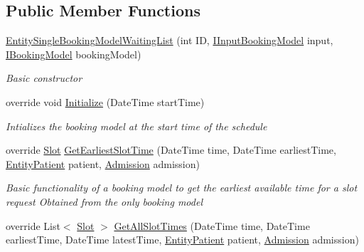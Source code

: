 \subsection*{Public Member Functions}
\begin{DoxyCompactItemize}
\item 
\hyperlink{class_general_health_care_elements_1_1_booking_models_1_1_entity_single_booking_model_waiting_list_aeac599ee0be6d7b497ce64829d4b53be}{Entity\+Single\+Booking\+Model\+Waiting\+List} (int ID, \hyperlink{interface_general_health_care_elements_1_1_department_models_1_1_outpatient_1_1_i_input_booking_model}{I\+Input\+Booking\+Model} input, \hyperlink{interface_general_health_care_elements_1_1_booking_models_1_1_i_booking_model}{I\+Booking\+Model} booking\+Model)
\begin{DoxyCompactList}\small\item\em Basic constructor \end{DoxyCompactList}\item 
override void \hyperlink{class_general_health_care_elements_1_1_booking_models_1_1_entity_single_booking_model_waiting_list_a9b8ad20df10518d7fbaf901707023b17}{Initialize} (Date\+Time start\+Time)
\begin{DoxyCompactList}\small\item\em Intializes the booking model at the start time of the schedule \end{DoxyCompactList}\item 
override \hyperlink{class_general_health_care_elements_1_1_booking_models_1_1_slot}{Slot} \hyperlink{class_general_health_care_elements_1_1_booking_models_1_1_entity_single_booking_model_waiting_list_ab1a3022462e90e9e342489805a27d0cd}{Get\+Earliest\+Slot\+Time} (Date\+Time time, Date\+Time earliest\+Time, \hyperlink{class_general_health_care_elements_1_1_entities_1_1_entity_patient}{Entity\+Patient} patient, \hyperlink{class_general_health_care_elements_1_1_treatment_admission_types_1_1_admission}{Admission} admission)
\begin{DoxyCompactList}\small\item\em Basic functionality of a booking model to get the earliest available time for a slot request Obtained from the only booking model \end{DoxyCompactList}\item 
override List$<$ \hyperlink{class_general_health_care_elements_1_1_booking_models_1_1_slot}{Slot} $>$ \hyperlink{class_general_health_care_elements_1_1_booking_models_1_1_entity_single_booking_model_waiting_list_ad088ebda27f16cc2e6452c8f779c6659}{Get\+All\+Slot\+Times} (Date\+Time time, Date\+Time earliest\+Time, Date\+Time latest\+Time, \hyperlink{class_general_health_care_elements_1_1_entities_1_1_entity_patient}{Entity\+Patient} patient, \hyperlink{class_general_health_care_elements_1_1_treatment_admission_types_1_1_admission}{Admission} admission)

\end{DoxyCompactItemize}
